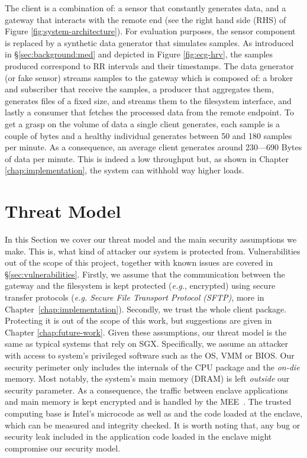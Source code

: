 The client is a combination of: a sensor that constantly generates data, and a gateway that interacts with the remote end (see the right hand side (RHS) of Figure \ref{fig:system-architecture}). 
For evaluation purposes, the sensor component is replaced by a synthetic data generator that simulates samples.
As introduced in \S\ref{sec:background:med} and depicted in Figure \ref{fig:ecg-hrv}, the samples produced correspond to RR intervals and their timestamps.
The data generator (or fake sensor) streams samples to the gateway which is composed of: a broker and subscriber that receive the samples, a producer that aggregates them, generates files of a fixed size, and streams them to the filesystem interface, and lastly a consumer that fetches the processed data from the remote endpoint. 
To get a grasp on the volume of data a single client generates, each sample is a couple of bytes and a healthy individual generates between 50 and 180 samples per minute.
As a consequence, an average client generates around 230---690 Bytes of data per minute.
This is indeed a low throughput but, as shown in Chapter \ref{chap:implementation}, the system can withhold way higher loads.

\section{Threat Model} \label{sec:threat}

In this Section we cover our threat model and the main security assumptions we make.
This is, what kind of attacker our system is protected from.
Vulnerabilities out of the scope of this project, together with known issues are covered in \S\ref{sec:vulnerabilities}.
Firstly, we assume that the communication between the gateway and the filesystem is kept protected (\emph{e.g.}, encrypted) using secure transfer protocols (\textit{e.g. Secure File Transport Protocol (SFTP)}, more in Chapter~\ref{chap:implementation}).
Secondly, we trust the whole client package.
Protecting it is out of the scope of this work, but suggestions are given in Chapter \ref{chap:future-work}.
Given these assumptions, our threat model is the same as typical systems that rely on \textsc{SGX}. 
Specifically, we assume an attacker with access to system's privileged software such as the OS, VMM or BIOS.
Our security perimeter only includes the internals of the CPU package and the \textit{on-die} memory.
Most notably, the system's main memory (DRAM) is left \emph{outside} our security parameter.
As a consequence, the traffic between enclave applications and main memory is kept encrypted and is handled by the MEE~\cite{Gueron16}.
The trusted computing base is Intel's microcode as well as and the code loaded at the enclave, which can be measured and integrity checked. 
It is worth noting that, any bug or security leak included in the application code loaded in the enclave might compromise our security model.

